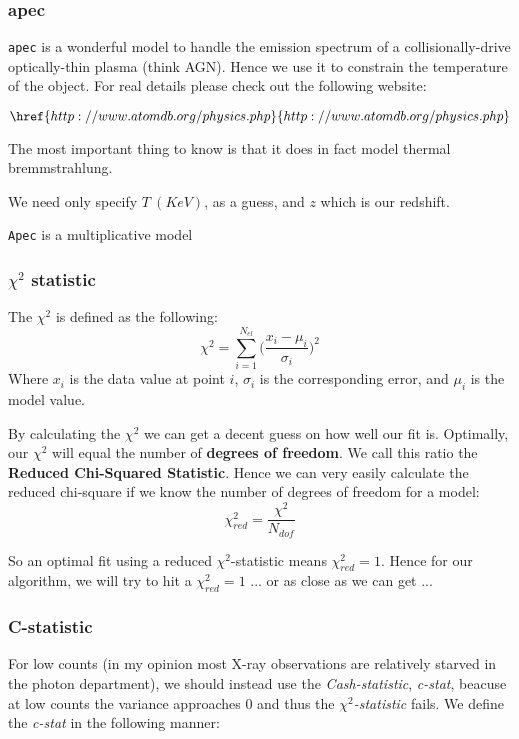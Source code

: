 \documentclass[11pt,letterpaper]{article}
\begin{document}
\subsubsection{apec}
\texttt{apec} is a wonderful model to handle the emission spectrum of a collisionally-drive optically-thin plasma (think AGN). Hence we use it to constrain the temperature of the object. For real details please check out the following website:

$$\href{http://www.atomdb.org/physics.php}{http://www.atomdb.org/physics.php} $$

The most important thing to know is that it does in fact model thermal bremmstrahlung. 

We need only  specify $T \ (KeV)$, as a guess, and $z$ which is our redshift.

\texttt{Apec} is a multiplicative model

\subsubsection{$\chi^2$ statistic}
The $\chi^2$ is defined as the following:
\begin{equation}
	\chi^2 = \sum_{i=1}^{N_{el}} \Bigg(  \frac{x_i-\mu_i}{\sigma_i}  \Bigg)^2
\end{equation}
Where $x_i$ is the data value at point $i$, $\sigma_i$ is the corresponding error, and $\mu_i$ is 
the model value.

By calculating the $\chi^2$ we can get a decent  guess on how well our fit is. Optimally, our $\chi^2$ will equal the number of \textbf{degrees of freedom}. We call this ratio the \textbf{Reduced Chi-Squared Statistic}. Hence we can very easily calculate the reduced chi-square if we know the number of degrees of freedom for a model:
\begin{equation}
	\chi^2_{red} = \frac{\chi^2}{N_{dof}}
\end{equation}

So an optimal fit using a reduced $\chi^2$-statistic means $\chi^2_{red} = 1$. Hence for our algorithm, we will try to hit a $\chi^2_{red} = 1$ ... or as close as we can get ... 

\subsubsection{C-statistic}
For low counts (in my opinion most X-ray observations are relatively starved in the photon department), we should instead use the \textit{Cash-statistic}, \textit{c-stat}, beacuse at low counts the variance approaches 0 and thus the $\chi^2$\textit{-statistic} fails. We define the \textit{c-stat} in the following manner:
\end{document}
